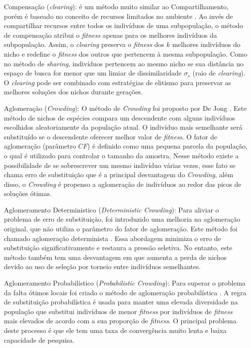 Compensação (\textit{clearing}): é um método muito similar ao Compartilhamento, porém é baseado no conceito de recursos limitados no ambiente \cite{clearing}. Ao invés de compartilhar recursos entre todos os indivíduos de uma subpopulação, o método de compensação atribui o \textit{fitness} apenas para os melhores indivíduos da subpopulação. Assim, o \textit{clearing} preserva o \textit{fitness} dos $k$ melhores indivíduos do nicho e redefine o \textit{fitness} dos outros que pertencem à mesma subpopulação. Como no método de \textit{sharing}, indivíduos pertencem ao mesmo nicho se sua distância no espaço de busca for menor que um limiar de dissimilaridade $\sigma_s$ (raio de \textit{clearing}). O \textit{clearing} pode ser combinado com estratégias de elitismo para preservar as melhores soluções dos nichos durante gerações.

Aglomeração (\textit{Crowding}): O método de \textit{Crowding} foi proposto por De Jong \cite{crowding}. Este método de nichos de espécies compara um descendente com alguns indivíduos escolhidos aleatoriamente da população atual. O indivíduo mais semelhante será substituído se o descendente oferecer melhor valor de \textit{fitness}. O fator de aglomeração (parâmetro $CF$) é definido como uma pequena parcela da população, o qual é utilizado para controlar o tamanho da amostra. Nesse método existe a possibilidade de se sobrescrever um mesmo indivíduo várias vezes, esse fato se chama erro de substituição que é a principal desvantagem do \textit{Crowding}, além disso, o \textit{Crowding} é propenso a aglomeração de indivíduos ao redor das picos de soluções ótimas.

Aglomeramento Deterministico (\textit{Deterministic Crowding}): Para aliviar o problema de erro de substituição, foi introduzido uma melhoria na aglomeração original, que não utiliza o parâmetro do fator de aglomeração. Este método foi chamado aglomeração determinista \cite{deterministic_crowding}. Essa abordagem minimiza o erro de substituição significativamente e restaura a pressão seletiva. No entanto, este método também tem uma desvantagem em que aumenta a perda de nichos devido ao uso de seleção por torneio entre indivíduos semelhantes.

Aglomeramento Probabilístico (\textit{Probabilistic Crowding}): Para superar o problema da falta ótimos locais foi criado o método de aglomeração probabilística \cite{probabilisti_crowding}. A regra de substituição probabilística é usada para manter uma elevada diversidade na população que substitui indivíduos de menor \textit{fitness} por indivíduos de \textit{fitness} mais elevados de acordo com a sua proporção de \textit{fitness}. O principal problema deste processo é que ele tem uma taxa de convergência muito lenta e baixa capacidade de pesquisa.


